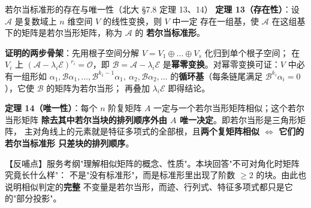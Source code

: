 
\begin{fdeep}{若尔当标准形的存在与唯一性（北大 §7.8 定理 13、14）}
\textbf{定理 13（存在性）}：设 $\mathscr{A}$ 是复数域上 $n$ 维空间 $V$ 的线性变换，则 $V$ 中一定
存在一组基，使 $\mathscr{A}$ 在这组基下的矩阵是若尔当形矩阵，称为 $\mathscr{A}$ 的
\textbf{若尔当标准形}。

\textbf{证明的两步骨架}：先用根子空间分解 $V=V_1\oplus\dots\oplus V_s$ 化归到单个根子空间；
在 $V_i$ 上 $(\mathscr{A}-\lambda_i\mathscr{E})^{r_i}=\mathscr{O}$，即 $\mathscr{B}=\mathscr{A}-\lambda_i\mathscr{E}$
是\textbf{幂零变换}。对幂零变换可证：$V$ 中必有一组形如
$\alpha_1,\mathscr{B}\alpha_1,\dots,\mathscr{B}^{k_1-1}\alpha_1,\ \alpha_2,\mathscr{B}\alpha_2,\dots$
的\textbf{循环基}（每条链尾满足 $\mathscr{B}^{k_i}\alpha_i=0$），它使 $\mathscr{B}$ 的矩阵为若尔当形；
再叠加 $\lambda_i\mathscr{E}$ 即得结论。

\textbf{定理 14（唯一性）}：每个 $n$ 阶复矩阵 $A$ 一定与一个若尔当形矩阵相似；这个若尔当形矩阵
\textbf{除去其中若尔当块的排列顺序外由 $A$ 唯一决定}。即若尔当形是三角形矩阵，
主对角线上的元素就是特征多项式的全部根，且\textbf{两个复矩阵相似 $\iff$ 它们的若尔当标准形
只差块的排列顺序}。

【反哺点】服务考纲"理解相似矩阵的概念、性质"。本块回答"不可对角化时矩阵究竟长什么样"：
不是"没有标准形"，而是标准形里出现了阶数 $\ge2$ 的块。由此也说明相似判定的\textbf{完整}
不变量是若尔当形，而迹、行列式、特征多项式都只是它的"部分投影"。
\end{fdeep}


